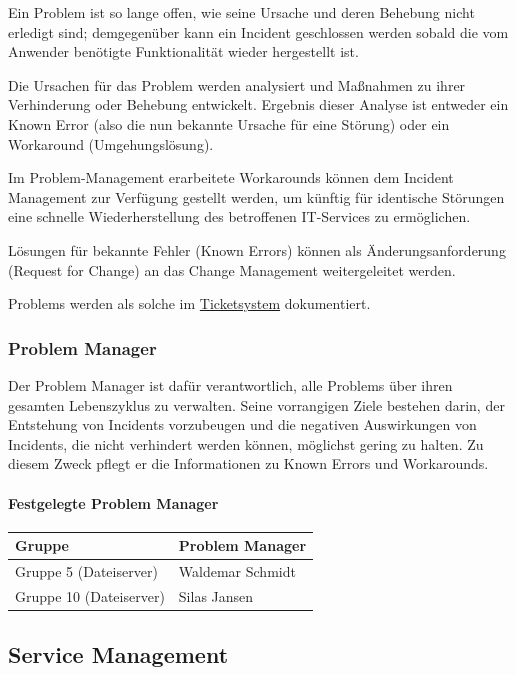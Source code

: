 \documentclass[]{article}
\let\oldparagraph\paragraph
\renewcommand{\paragraph}[1]{\oldparagraph{#1}\mbox{}}
\begin{document}
Ein Problem ist so lange offen, wie seine Ursache und deren Behebung
nicht erledigt sind; demgegenüber kann ein Incident geschlossen werden
sobald die vom Anwender benötigte Funktionalität wieder hergestellt ist.

Die Ursachen für das Problem werden analysiert und Maßnahmen zu ihrer
Verhinderung oder Behebung entwickelt. Ergebnis dieser Analyse ist
entweder ein Known Error (also die nun bekannte Ursache für eine
Störung) oder ein Workaround (Umgehungslösung).

Im Problem-Management erarbeitete Workarounds können dem Incident
Management zur Verfügung gestellt werden, um künftig für identische
Störungen eine schnelle Wiederherstellung des betroffenen IT-Services zu
ermöglichen.

Lösungen für bekannte Fehler (Known Errors) können als
Änderungsanforderung (Request for Change) an das Change Management
weitergeleitet werden.

Problems werden als solche im
\href{https://docs.google.com/spreadsheets/d/1GDq3AEsVDu1a-X7tEl6qKDtSZdAXm8lsRzY6Ijw-dUQ/edit\#gid=0}{Ticketsystem}
dokumentiert.

\subsubsection{Problem Manager}\label{problem-manager}

Der Problem Manager ist dafür verantwortlich, alle Problems über ihren
gesamten Lebenszyklus zu verwalten. Seine vorrangigen Ziele bestehen
darin, der Entstehung von Incidents vorzubeugen und die negativen
Auswirkungen von Incidents, die nicht verhindert werden können,
möglichst gering zu halten. Zu diesem Zweck pflegt er die Informationen
zu Known Errors und Workarounds.

\paragraph{Festgelegte Problem
Manager}\label{festgelegte-problem-manager}

\begin{longtable}{ll}
\toprule
Gruppe & Problem Manager\tabularnewline
\midrule
Gruppe 5 (Dateiserver) & Waldemar Schmidt\tabularnewline
Gruppe 10 (Dateiserver) & Silas Jansen\tabularnewline
\bottomrule
\end{longtable}

\subsection{Service Management}\label{service-management}
\end{document}
